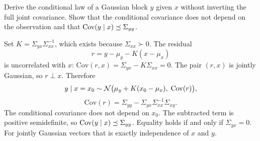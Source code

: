 \begin{hwqbox}
Derive the conditional law of a Gaussian block $y$ given $x$ without inverting the full joint covariance. Show that the conditional covariance does not depend on the observation and that $\mathrm{Cov}(y\mid x)\preceq\Sigma_{yy}$.
\end{hwqbox}
\begin{hwsolbox}
Set $K=\Sigma_{yx}\Sigma_{xx}^{-1}$, which exists because $\Sigma_{xx}\succ 0$. The residual
\[
r=y-\mu_y-K(x-\mu_x)
\]
is uncorrelated with $x$: $\mathrm{Cov}(r,x)=\Sigma_{yx}-K\Sigma_{xx}=0$. The pair $(r,x)$ is jointly Gaussian, so $r\perp x$. Therefore
\[
y\mid x=x_0\sim\mathcal{N}\bigl(\mu_y+K(x_0-\mu_x),\;\mathrm{Cov}(r)\bigr),
\]
\[
\mathrm{Cov}(r)=\Sigma_{yy}-\Sigma_{yx}\Sigma_{xx}^{-1}\Sigma_{xy}.
\]
The conditional covariance does not depend on $x_0$. The subtracted term is positive semidefinite, so $\mathrm{Cov}(y\mid x)\preceq\Sigma_{yy}$. Equality holds if and only if $\Sigma_{yx}=0$. For jointly Gaussian vectors that is exactly independence of $x$ and $y$.
\end{hwsolbox}

